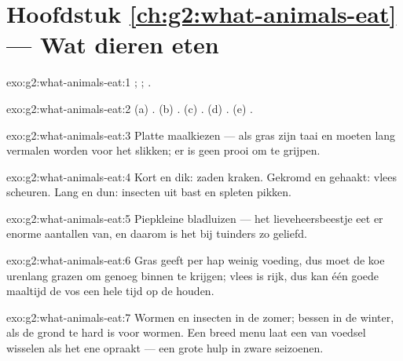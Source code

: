 \section*{Hoofdstuk \ref{ch:g2:what-animals-eat} --- Wat dieren eten}

\begin{solution}{exo:g2:what-animals-eat:1}
; ; .
\end{solution}

\begin{solution}{exo:g2:what-animals-eat:2}
(a) . (b) . (c) . (d) .
(e) .
\end{solution}

\begin{solution}{exo:g2:what-animals-eat:3}
Platte maalkiezen ---  als gras zijn taai en moeten lang
vermalen worden voor het slikken; er is geen prooi om te grijpen.
\end{solution}

\begin{solution}{exo:g2:what-animals-eat:4}
Kort en dik: zaden kraken. Gekromd en gehaakt: vlees scheuren. Lang en
dun: insecten uit bast en spleten pikken.
\end{solution}

\begin{solution}{exo:g2:what-animals-eat:5}
Piepkleine bladluizen --- het lieveheersbeestje eet er enorme aantallen
van, en daarom is het bij tuinders zo geliefd.
\end{solution}

\begin{solution}{exo:g2:what-animals-eat:6}
Gras geeft per hap weinig voeding, dus moet de koe urenlang grazen om
genoeg binnen te krijgen; vlees is rijk, dus kan één goede maaltijd de
vos een hele tijd op de  houden.
\end{solution}

\begin{solution}{exo:g2:what-animals-eat:7}
Wormen en insecten in de zomer; bessen in de winter, als de grond te
hard is voor wormen. Een breed menu laat een  van voedsel
wisselen als het ene opraakt --- een grote hulp in zware seizoenen.
\end{solution}

